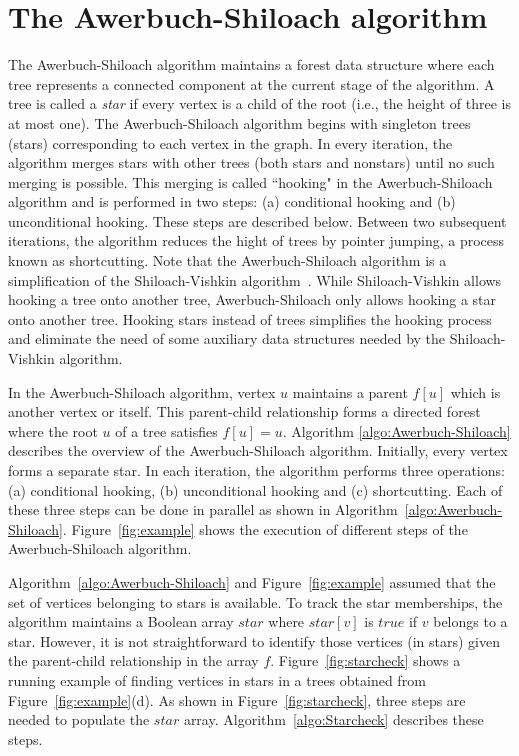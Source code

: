 \section{The Awerbuch-Shiloach algorithm}
The Awerbuch-Shiloach algorithm maintains a forest data structure where each tree represents a connected component at the current stage of the algorithm.
A tree is called a \emph{star} if every vertex is a child of the root (i.e., the height of three is at most one).
The Awerbuch-Shiloach algorithm begins with singleton trees (stars) corresponding to each vertex in the graph.
In every iteration, the algorithm merges stars with other trees (both stars and nonstars) until no such merging is possible. 
This merging is called ``hooking" in the Awerbuch-Shiloach algorithm and is performed in two steps: (a) conditional hooking and (b) unconditional hooking. These steps are described below.
Between two subsequent iterations, the algorithm reduces the hight of trees by pointer jumping, a process known as shortcutting. 
Note that the Awerbuch-Shiloach algorithm is a simplification of the Shiloach-Vishkin algorithm~\cite{shiloach1980log}. While Shiloach-Vishkin allows hooking a tree onto another tree, Awerbuch-Shiloach only allows hooking a star onto another tree. Hooking stars instead of trees simplifies the hooking process and eliminate the need of some auxiliary data structures needed by the Shiloach-Vishkin algorithm.

In the Awerbuch-Shiloach algorithm, vertex $u$ maintains a parent $f[u]$ which is another vertex or itself. 
This parent-child relationship forms a directed forest where the root $u$ of a tree satisfies $f[u]=u$.
Algorithm \ref{algo:Awerbuch-Shiloach} describes the overview of the Awerbuch-Shiloach algorithm.
Initially, every vertex forms a separate star. 
In each iteration, the algorithm performs three operations: (a) conditional hooking, (b) unconditional hooking and (c) shortcutting.
Each of these three steps can be done in parallel as shown in Algorithm~\ref{algo:Awerbuch-Shiloach}.
Figure~\ref{fig:example} shows the execution of different steps of the Awerbuch-Shiloach algorithm.

Algorithm~\ref{algo:Awerbuch-Shiloach} and Figure~\ref{fig:example} assumed that the set of vertices belonging to stars is available.  
To track the star memberships, the algorithm maintains a Boolean array $star$ where $star[v]$ is $true$ if $v$ belongs to a star.
However, it is not straightforward to identify those vertices (in stars) given the parent-child relationship in the array $f$.
Figure~\ref{fig:starcheck} shows a running example of finding vertices in stars in a trees obtained from Figure~\ref{fig:example}(d).
As shown in Figure~\ref{fig:starcheck}, three steps are needed to populate the $star$ array. 
Algorithm~\ref{algo:Starcheck} describes these steps.


